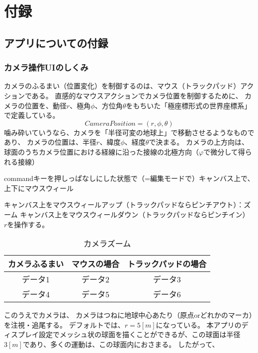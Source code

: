 \part*{付録}
\setcounter{chapter}{0} %
\chapter{アプリについての付録}
\section{カメラ操作UIのしくみ}
カメラのふるまい（位置変化）を制御するのは、マウス（トラックパッド）アクションである。
直感的なマウスアクションでカメラ位置を制御するために、
カメラの位置を、動径$r$、極角$\phi$、方位角$\theta$をもちいた「極座標形式の世界座標系」で定義している。
$$Camera Position = (r, \phi, \theta)$$
噛み砕いていうなら、カメラを「半径可変の地球上」で移動させるようなものであり、
カメラの位置は、半径$r$、緯度$\phi$、経度$\theta$で決まる。
カメラの上方向は、球面のうちカメラ位置における経線に沿った接線の北極方向（$φ$で微分して得られる接線）

commandキーを押しっぱなしにした状態で（=編集モードで）キャンバス上で、
上下にマウスウィール

キャンバス上をマウスウィールアップ（トラックパッドならピンチアウト）：ズーム
キャンバス上をマウスウィールダウン（トラックパッドならピンチイン）
$r$を操作する。
\begin{table}[ht]
  \centering
  \caption{カメラズーム}
  \label{tab:sampletable}
  \begin{tabular}{@{} ccc @{}}%
  \toprule
  カメラふるまい & マウスの場合 & トラックパッドの場合 \\
  \midrule
  データ1 & データ2 & データ3 \\
  データ4 & データ5 & データ6 \\
  \bottomrule
  \end{tabular}
  \end{table}

このうえでカメラは、
カメラはつねに地球中心あたり（原点orどれかのマーカ）を注視・追尾する。
デフォルトでは、$r = 5[m]$になっている。
本アプリのディスプレイ設定でメッシュ状の球面を描くことができるが、この球面は半径$3[m]$であり、多くの運動は、この球面内におさまる。
したがって、

